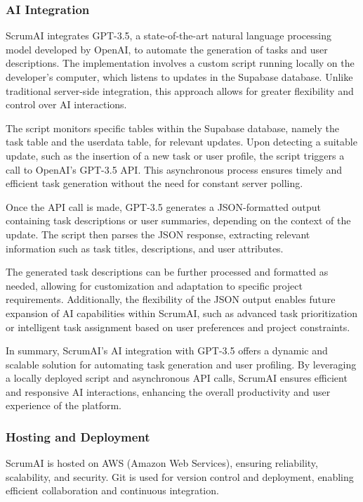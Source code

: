 \documentclass[conference]{IEEEtran}
\begin{document}
\subsubsection{AI Integration}
ScrumAI integrates GPT-3.5, a state-of-the-art natural language processing model developed by OpenAI, to automate the generation of tasks and user descriptions. The implementation involves a custom script running locally on the developer's computer, which listens to updates in the Supabase database. Unlike traditional server-side integration, this approach allows for greater flexibility and control over AI interactions.

The script monitors specific tables within the Supabase database, namely the task table and the userdata table, for relevant updates. Upon detecting a suitable update, such as the insertion of a new task or user profile, the script triggers a call to OpenAI's GPT-3.5 API. This asynchronous process ensures timely and efficient task generation without the need for constant server polling.

Once the API call is made, GPT-3.5 generates a JSON-formatted output containing task descriptions or user summaries, depending on the context of the update. The script then parses the JSON response, extracting relevant information such as task titles, descriptions, and user attributes.

The generated task descriptions can be further processed and formatted as needed, allowing for customization and adaptation to specific project requirements. Additionally, the flexibility of the JSON output enables future expansion of AI capabilities within ScrumAI, such as advanced task prioritization or intelligent task assignment based on user preferences and project constraints.

In summary, ScrumAI's AI integration with GPT-3.5 offers a dynamic and scalable solution for automating task generation and user profiling. By leveraging a locally deployed script and asynchronous API calls, ScrumAI ensures efficient and responsive AI interactions, enhancing the overall productivity and user experience of the platform.

\subsubsection{Hosting and Deployment}
ScrumAI is hosted on AWS (Amazon Web Services), ensuring reliability, scalability, and security. Git is used for version control and deployment, enabling efficient collaboration and continuous integration.
\end{document}
